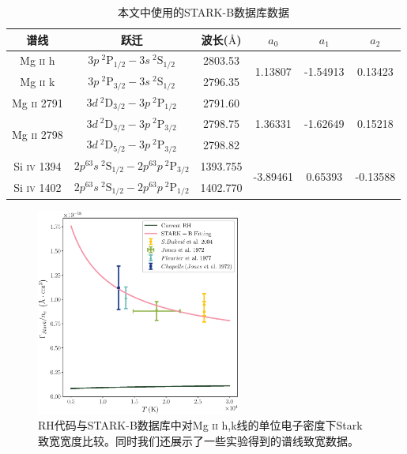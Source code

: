 \begin{table}
	\begin{tabular}{cccccc}
	\hline
    谱线 & 跃迁 & 波长($\mbox{{\AA}}$) & $a_0$ & $a_1$ & $a_2$ \\ 
 	\hline
    Mg \textsc{ii} h& $3p\ ^2\mathrm{P}_{1/2}-3s\ ^2\mathrm{S}_{1/2}$  & 2803.53 & \multirow{2}{*}{1.13807} &\multirow{2}{*}{-1.54913} & \multirow{2}{*}{0.13423}\\ 
    Mg \textsc{ii} k& $3p\ ^2\mathrm{P}_{3/2}-3s\ ^2\mathrm{S}_{1/2}$  & 2796.35\\ 
    \hline
    Mg \textsc{ii} 2791  & $3d\ ^2\mathrm{D}_{3/2}-3p\ ^2\mathrm{P}_{1/2}$ &2791.60& \multirow{3}{*}{1.36331}& \multirow{3}{*}{-1.62649} & \multirow{3}{*}{0.15218}\\ 
    \multirow{2}{*}{Mg \textsc{ii} 2798}  & $3d\ ^2\mathrm{D}_{3/2}-3p\ ^2\mathrm{P}_{3/2}$ &2798.75\\
     & $3d\ ^2\mathrm{D}_{5/2}-3p\ ^2\mathrm{P}_{3/2}$ & 2798.82 \\
     \hline
    Si \textsc{iv} 1394& $2p^63s\ ^2\mathrm{S}_{1/2}-2p^63p\ ^2\mathrm{P}_{3/2}$  & 1393.755 & \multirow{2}{*}{-3.89461} &\multirow{2}{*}{0.65393} & \multirow{2}{*}{-0.13588}\\ 
    Si \textsc{iv} 1402& $2p^63s\ ^2\mathrm{S}_{1/2}-2p^63p\ ^2\mathrm{P}_{1/2}$  & 1402.770\\ 
    \hline
\end{tabular}
    \caption{本文中使用的STARK-B数据库数据}\label{Table1}
\end{table}

\begin{figure}
	\centering
	\includegraphics[width=0.6\textwidth]{figs/SB_Mg}
	\caption{RH代码与STARK-B数据库中对Mg \textsc{ii} h,k线的单位电子密度下Stark致宽宽度比较。同时我们还展示了一些实验得到的谱线致宽数据\parencites{Jones1972,Fleurier1977,Bukvic2004}。}\label{fig:2.1}
\end{figure}

